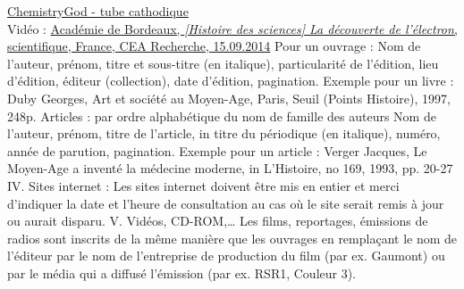 \documentclass[../main.tex]{subfiles}
\begin{document}
\href{https://chemistrygod.com/cathode-ray-tube-experiments}{ChemistryGod - tube cathodique}\\
Vidéo :
\href{https://www.youtube.com/watch?v=WHoH5m83Ga0}{Académie de Bordeaux, \textit{[Histoire des sciences] La découverte de l'électron}, scientifique, France, CEA Recherche, 15.09.2014}
Pour un ouvrage :
Nom  de  l’auteur,  prénom,  titre  et  sous-titre  (en  italique),  particularité  de l’édition,  lieu  d’édition,  éditeur  (collection),  date  d’édition,  pagination.
Exemple  pour un livre  : Duby  Georges,  Art  et  société  au  Moyen-Age,  Paris,  Seuil  (Points Histoire),  1997,  248p.
Articles  :  par  ordre  alphabétique  du  nom  de  famille  des  auteurs 
Nom  de  l’auteur,  prénom,  titre  de  l’article,  in  titre  du  périodique  (en  italique), numéro,  année  de  parution,  pagination. 
Exemple  pour  un  article  : Verger  Jacques,  Le  Moyen-Age  a  inventé  la  médecine  moderne,  in L’Histoire, no 169, 1993, pp. 20-27 IV.
Sites  internet  :
Les  sites  internet  doivent  être  mis  en  entier  et  merci  d’indiquer  la  date  et l’heure  de  consultation  au  cas  où  le  site  serait  remis  à  jour  ou  aurait  disparu.
V.  Vidéos,
CD-ROM,… Les  films,  reportages,  émissions  de  radios  sont  inscrits  de  la  même  manière que  les  ouvrages  en  remplaçant  le  nom  de  l’éditeur  par  le  nom  de  l’entreprise de  production  du  film  (par  ex.  Gaumont)  ou  par  le  média  qui  a  diffusé l’émission  (par  ex.  RSR1,  Couleur  3). 
\end{document}
